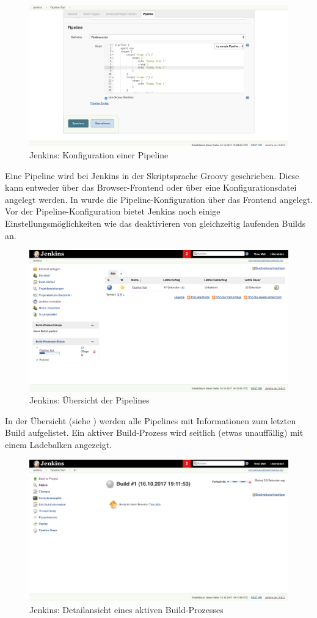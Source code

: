 \begin{figure}[h]
  \caption{Jenkins: Konfiguration einer Pipeline}
  \label{fig:jenkins-pipeline-config}
  \includegraphics[width=.8\textwidth]{assets/jenkins-pipeline-script}
\end{figure}

Eine Pipeline wird bei Jenkins in der Skriptsprache Groovy geschrieben. Diese kann entweder über das Browser-Frontend oder über eine Konfigurationsdatei angelegt werden. In  wurde die Pipeline-Konfiguration über das Frontend angelegt. Vor der Pipeline-Konfiguration bietet Jenkins noch einige Einstellungsmöglichkeiten wie das deaktivieren von gleichzeitig laufenden Builds an.

\begin{figure}[h]
  \caption{Jenkins: Übersicht der Pipelines}
  \label{fig:jenkins-pipeline-overview}
  \includegraphics[width=.8\textwidth]{assets/jenkins-pipeline-overview}
\end{figure}

In der Übersicht (siehe ) werden alle Pipelines mit Informationen zum letzten Build aufgelistet. Ein aktiver Build-Prozess wird seitlich (etwas unauffällig) mit einem Ladebalken angezeigt.

\begin{figure}[h]
  \caption{Jenkins: Detailansicht eines aktiven Build-Prozesses}
  \label{fig:jenkins-build-detail}
  \includegraphics[width=.8\textwidth]{assets/jenkins-build-detail}
\end{figure}

